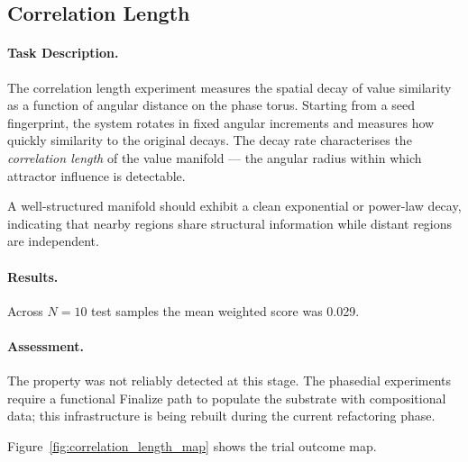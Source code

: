 \subsection{Correlation Length}
\label{sec:correlation_length}

\paragraph{Task Description.}
The correlation length experiment measures the spatial decay of value
similarity as a function of angular distance on the phase torus.
Starting from a seed fingerprint, the system rotates in fixed angular
increments and measures how quickly similarity to the original decays.
The decay rate characterises the \textit{correlation length} of the value
manifold --- the angular radius within which attractor influence is
detectable.

A well-structured manifold should exhibit a clean exponential or
power-law decay, indicating that nearby regions share structural
information while distant regions are independent.

\paragraph{Results.}
Across $N = 10$ test samples the mean weighted score was 0.029.

\paragraph{Assessment.}
The property was not reliably detected at this stage.  The phasedial
experiments require a functional Finalize path to populate the substrate
with compositional data; this infrastructure is being rebuilt during
the current refactoring phase.

Figure~\ref{fig:correlation_length_map} shows the trial outcome map.
